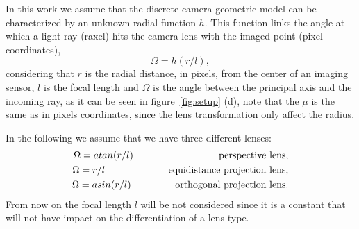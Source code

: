 In this work we assume that the discrete camera geometric model can be characterized by an unknown radial function $h$. This function links the angle at which a light ray (raxel) hits the camera lens with the imaged point (pixel coordinates), 
%
\begin{equation}
\Omega=h(r/l),%
\end{equation}
%
considering that $r$ is the radial distance, in pixels, from the center of an imaging sensor, $l$ is the focal length and $\Omega$ is the angle between the principal axis and the incoming ray, as it can be seen in figure~\ref{fig:setup} (d), note that the $\mu$ is the same as in pixels coordinates, since the lens transformation only affect the radius.

In the following we assume  that we have three different lenses\cite{Kannala06}: 
%
%
%
%
\begin{eqnarray}
\Omega =atan(r/l) \label{eq:presp} \hspace{3.1cm} \text{perspective lens,}\\
%
%
\Omega =r/l \hspace{2.3cm} \text{equidistance projection lens,}\label{eq:equi}\\
%
%	
\Omega =asin(r/l)  \hspace{1.6cm} \text{orthogonal projection lens.} 
\label{eq:ortho}
\end{eqnarray}
%
From now on the focal length $l$ will be not considered since it is a constant that will not have impact on the differentiation of a lens type.

